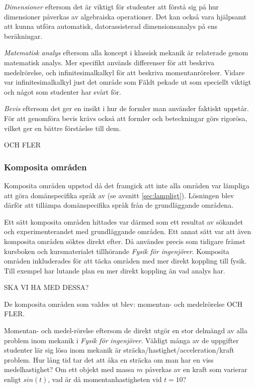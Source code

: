 \begin{binge}
\textit{Dimensioner} eftersom det är viktigt för studenter att förstå sig på hur dimensioner påverkas av algebraiska operationer. Det kan också vara hjälpsamt att kunna utföra automatisk, datorassisterad dimensionsanalys på ens beräkningar.

\textit{Matematisk analys} eftersom alla koncept i klassisk mekanik är relaterade genom matematisk analys. Mer specifikt används differenser för att beskriva medelrörelse, och infinitesimalkalkyl för att beskriva momentanrörelser. Vidare var infinitesimalkalkyl just det område som Fäldt pekade ut som speciellt viktigt och något som studenter har svårt för.

\textit{Bevis} eftersom det ger en insikt i hur de formler man använder faktiskt uppstår. För att genomföra bevis krävs också att formler och beteckningar görs rigorösa, vilket ger en bättre förståelse till dem.

OCH FLER
  
\subsubsection{Komposita områden}
\label{sec:selektion_komposit}

Komposita områden uppstod då det framgick att inte alla områden var lämpliga att göra domänspecifika språk av (se avsnitt \ref{sec:lampligt}). Lösningen blev därför att tillämpa domänspecifika språk från de grundläggande områdena.

Ett sätt komposita områden hittades var därmed som ett resultat av sökandet och experimenterandet med grundläggande områden. Ett annat sätt var att även komposita områden söktes direkt efter. Då användes precis som tidigare främst kursboken och kursmaterialet tillhörande \textit{Fysik för ingenjörer}. Komposita områden inkluderades för att täcka områden med mer direkt koppling till fysik. Till exempel har lutande plan en mer direkt koppling än vad analys har.

SKA VI HA MED DESSA?

De komposita områden som valdes ut blev: momentan- och medelrörelse OCH FLER.

  Momentan- och medel-rörelse eftersom de direkt utgör en stor delmängd
  av alla problem inom mekanik i \textit{Fysik för ingenjörer}. Väldigt många av
  de uppgifter studenter lär sig lösa inom mekanik är
  sträcka/hastighet/acceleration/kraft problem. Hur lång tid tar det att åka en
  sträcka om man har en viss medelhastighet? Om ett objekt med massa $m$
  påverkas av en kraft som varierar enligt $sin(t)$, vad är då
  momentanhastigheten vid $t=10$?
  

\end{binge}
